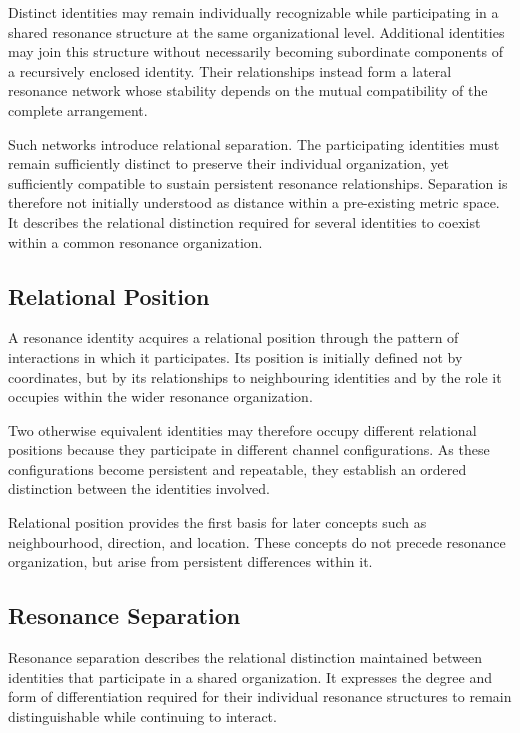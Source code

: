 \documentclass[11pt,a4paper]{article}
\begin{document}
Distinct identities may remain individually recognizable while participating in a shared resonance structure at the same organizational level. Additional identities may join this structure without necessarily becoming subordinate components of a recursively enclosed identity. Their relationships instead form a lateral resonance network whose stability depends on the mutual compatibility of the complete arrangement.

Such networks introduce relational separation. The participating identities must remain sufficiently distinct to preserve their individual organization, yet sufficiently compatible to sustain persistent resonance relationships. Separation is therefore not initially understood as distance within a pre-existing metric space. It describes the relational distinction required for several identities to coexist within a common resonance organization.

\subsection{Relational Position}

A resonance identity acquires a relational position through the pattern of interactions in which it participates. Its position is initially defined not by coordinates, but by its relationships to neighbouring identities and by the role it occupies within the wider resonance organization.

Two otherwise equivalent identities may therefore occupy different relational positions because they participate in different channel configurations. As these configurations become persistent and repeatable, they establish an ordered distinction between the identities involved.

Relational position provides the first basis for later concepts such as neighbourhood, direction, and location. These concepts do not precede resonance organization, but arise from persistent differences within it.

\subsection{Resonance Separation}

Resonance separation describes the relational distinction maintained between identities that participate in a shared organization. It expresses the degree and form of differentiation required for their individual resonance structures to remain distinguishable while continuing to interact.
\end{document}

